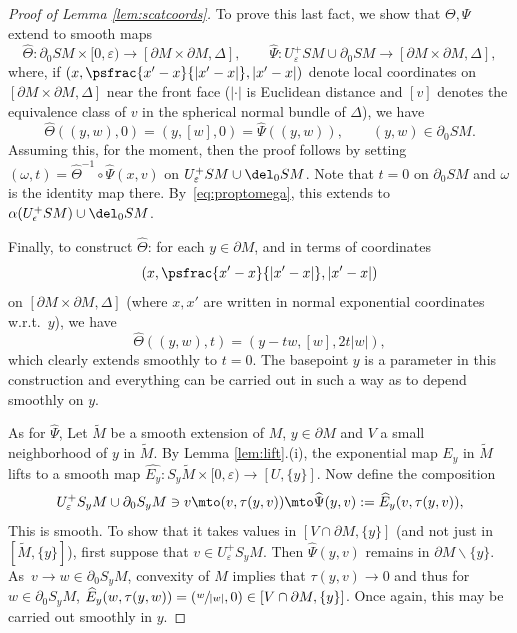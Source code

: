 \begin{proof}[Proof of Lemma \ref{lem:scatcoords}]
To prove this last fact, we show that $\Theta,\Psi$ extend to smooth maps
\begin{equation*}
\widehat{\Theta} \colon \partial_0 SM \times [0,\varepsilon) \to [\partial M\times \partial M,\Delta], \qquad
\widehat{\Psi} \colon U_\varepsilon^+ SM \cup \partial_0 SM \to [\partial M\times \partial M,\Delta],
\end{equation*}
where, if $(x,\psfrac{x'-x}{|x'-x|},|x'-x|)$ denote local coordinates on $[\partial M\times \partial M,\Delta]$ near the front face
($|\cdot|$ is Euclidean distance and $[v]$ denotes the equivalence class of $v$ in the spherical normal bundle of $\Delta$), we have
\begin{equation*}
\widehat{\Theta}((y,w),0) = (y,[w],0) = \widehat{\Psi} ((y,w)), \qquad (y,w)\in \partial_0 SM.
\end{equation*}
Assuming this, for the moment, then the proof follows by setting $(\omega,t) = \widehat{\Theta}^{-1}\circ \widehat{\Psi} (x,v)$ on
$U_\varepsilon^+ SM \cup \del_0 SM$. Note that $t=0$ on $\partial_0 SM$ and $\omega$ is the identity map there. By~\eqref{eq:proptomega},
this extends to $\alpha(U_\epsilon^+ SM) \cup \del_0 SM$.

Finally, to construct $\widehat{\Theta}$: for each $y\in \partial M$, and in terms of coordinates
\begin{equation*}
(x,\psfrac{x'-x}{|x'-x|},|x'-x|)
\end{equation*}
on $[\partial M\times \partial M, \Delta]$ (where $x,x'$ are written in normal exponential coordinates w.r.t.~$y$), we have
\begin{equation*}
\widehat{\Theta}((y,w),t) = (y-tw, [w], 2t |w|),
\end{equation*}
which clearly extends smoothly to $t=0$. The basepoint $y$ is a parameter in this construction and everything can be carried out in such a way as to depend smoothly on $y$.

As for $\widehat{\Psi}$, Let $\widetilde{M}$ be a smooth extension of $M$, $y\in \partial M$ and $V$ a small neighborhood of $y$ in
$\widetilde{M}$. By Lemma \ref{lem:lift}.(i), the exponential map $E_y$ in $\widetilde{M}$ lifts to a smooth map $\widehat{E_y} \colon S_y \widetilde{M}\times [0,\varepsilon) \to [U,\{y\}]$. Now define the composition
\begin{equation*}
U_\varepsilon^+ S_y M \cup \partial_0 S_y M \ni v \mto (v, \tau(y,v)) \mto \widehat{\Psi}(y,v) := \widehat{E}_y (v, \tau(y,v)),
\end{equation*}
This is smooth. To show that it takes values in $[V\cap \partial M, \{y\}]$ (and not just in $[\widetilde M, \{y\}]$),
first suppose that $v\in U_\varepsilon^+ S_y M$. Then $\widehat{\Psi}(y,v)$ remains in $\partial M\backslash \{y\}$.
As~$v\to w \in \partial_0 S_y M$, convexity of $M$ implies that $\tau(y,v) \to 0$ and thus for $w\in \partial_0 S_y M$,
$\widehat{E}_y (w, \tau(y,w)) = (\sfrac{w}{|w|},0) \in [V\cap \partial M, \{y\}]$. Once again, this may be carried out
smoothly in $y$.
\end{proof}

